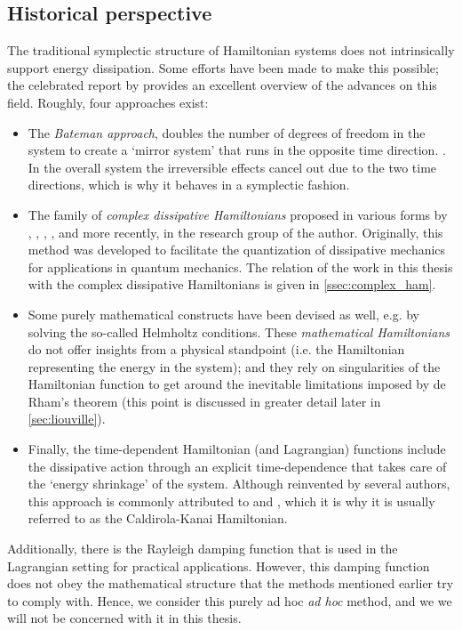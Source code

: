\subsection{Historical perspective} 
The traditional symplectic structure of Hamiltonian systems does not intrinsically support energy dissipation. Some efforts have been made to make this possible; the celebrated report by \citet{Dekker1981} provides an excellent overview of the advances on this field. Roughly, four approaches exist:
\begin{itemize}
    \item The \emph{Bateman approach}, doubles the number of degrees of freedom in the system to create a `mirror system' that runs in the opposite time direction. \cite{Bateman1931}. In the overall system the irreversible effects cancel out due to the two time directions, which is why it behaves in a symplectic fashion.
    \item The family of \emph{complex dissipative Hamiltonians} proposed in various forms by \citet{Bopp1974}, \citet{Dekker1975}, \citet{Dedene1980}, \citet{Rajeev2007}, and more recently, \citet{Hutters2020} in the research group of the author. Originally, this method was developed to facilitate the quantization of dissipative mechanics for applications in quantum mechanics. The relation of the work in this thesis with the complex dissipative Hamiltonians is given in \cref{ssec:complex_ham}.
    \item Some purely mathematical constructs have been devised as well, e.g. by \citet{Havas1957} solving the so-called Helmholtz conditions. These \emph{mathematical Hamiltonians} do not offer insights from a physical standpoint (i.e. the Hamiltonian representing the energy in the system); and they rely on singularities of the Hamiltonian function to get around the inevitable limitations imposed by de Rham's theorem (this point is discussed in greater detail later in \cref{sec:liouville}).
    \item Finally, the time-dependent Hamiltonian (and Lagrangian) functions include the dissipative action through an explicit time-dependence that takes care of the `energy shrinkage' of the system. Although reinvented by several authors, this approach is commonly attributed to \citet{Caldirola1941} and \citet{Kanai1948}, which it is why it is usually referred to as the Caldirola-Kanai Hamiltonian.
\end{itemize}
Additionally, there is the Rayleigh damping function that is used in the Lagrangian setting for practical applications. However, this damping function does not obey the mathematical structure that the methods mentioned earlier try to comply with. Hence, we consider this purely ad hoc \emph{ad hoc} method, and we we will not be concerned with it in this thesis. \cite{Goldstein2011}

